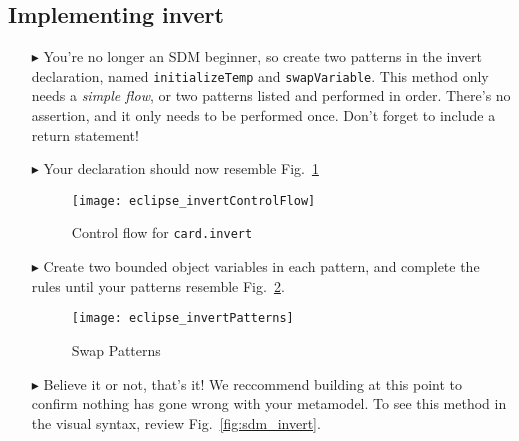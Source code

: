 \newpage
\subsection{Implementing invert}
\texHeader
\hypertarget{invertCard tex}{}

\begin{itemize}

\item[$\blacktriangleright$] You're no longer an SDM beginner, so create two patterns in the invert declaration, named \texttt{initializeTemp} and
\texttt{swapVariable}. This method only needs a \emph{simple flow}, or two patterns listed and performed in order. There's no assertion, and it only needs to be
performed once. Don't forget to include a return statement!

\item[$\blacktriangleright$] Your declaration should now resemble Fig.~\ref{fig:eclipse_invert}

\begin{figure}[htbp]
\begin{center}
  \texttt{[image: eclipse\_invertControlFlow]}
  \caption{Control flow for \texttt{card.invert}}  
  \label{fig:eclipse_invert}
\end{center}
\end{figure}

\item[$\blacktriangleright$] Create two bounded object variables in each pattern, and complete the rules until your patterns resemble
Fig.~\ref{fig:invertPatterns}.

\begin{figure}[htbp]
\begin{center}
  \texttt{[image: eclipse\_invertPatterns]}
  \caption{Swap Patterns}  
  \label{fig:invertPatterns}
\end{center}
\end{figure}

\item[$\blacktriangleright$] Believe it or not, that's it! We reccommend building at this point to confirm nothing has gone wrong with your metamodel. To
see this method in the visual syntax, review Fig.~\ref{fig:sdm_invert}.

\end{itemize}
